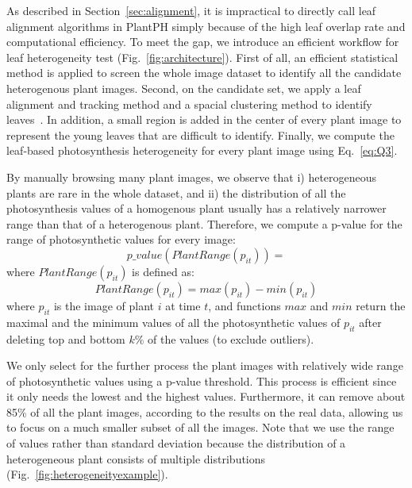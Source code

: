 \documentclass{bioinfo}
\begin{document}
\begin{methods}
As described in Section~\ref{sec:alignment}, it is impractical to directly call leaf alignment algorithms in PlantPH simply because of the high leaf overlap rate and computational efficiency. To meet the gap, we introduce an efficient workflow for leaf heterogeneity test (Fig.~\ref{fig:architecture}).
%
First of all, an efficient statistical method is applied to screen the whole image dataset to identify all the candidate heterogenous plant images. Second, on the candidate set, we apply a leaf alignment and tracking method and a spacial clustering method to identify leaves~\citep{ester1996density,kriegel2011density,xi2014tracking,yin2014}. In addition, a small region is added in the center of every plant image to represent the young leaves that are difficult to identify. Finally, we compute the leaf-based photosynthesis heterogeneity for every plant image using Eq.~\ref{eq:Q3}.
%

By manually browsing many plant images, we observe that i) heterogeneous plants are rare in the whole dataset, and ii) the distribution of all the photosynthesis values of a homogenous plant usually has a relatively narrower range than that of a heterogenous plant.
%
Therefore, we compute a p-value for the range of photosynthetic values for every image:
%
\begin{equation}
p\_value(PlantRange(p_{it})) =
\end{equation}
\noindent where $PlantRange(p_{it})$ is defined as:
%
\begin{equation}
PlantRange(p_{it}) = max(p_{it}) - min(p_{it})
\end{equation}
%
\noindent where $p_{it}$ is the image of plant $i$ at time $t$, and functions $max$ and $min$ return the maximal and the minimum values of all the photosynthetic values of $p_{it}$ after deleting top and bottom $k\%$ of the values (to exclude outliers).

We only select for the further process the plant images with relatively wide range of photosynthetic values using a p-value threshold. This process is efficient since it only needs the lowest and the highest values. Furthermore, it can remove about 85\% of all the plant images, according to the results on the real data, allowing us to focus on a much smaller subset of all the images. Note that we use the range of values rather than standard deviation because the distribution of a heterogeneous plant consists of multiple distributions (Fig.~\ref{fig:heterogeneityexample}).


\end{methods}
\end{document}
